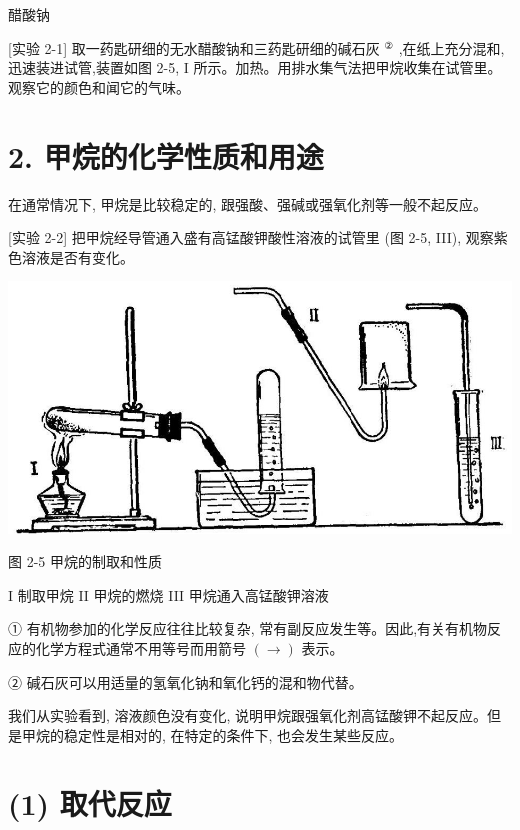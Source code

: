 \documentclass[10pt]{article}
\newcommand{\customfootnote}[1]{
  \let\thefootnote\relax\footnotetext{#1}
}
\begin{document}
\customfootnote{

① \(\sigma\) 音 \(\operatorname{sigm}{\bar{a}}_{0}\)

}

醋酸钠

[实验 2-1] 取一药匙研细的无水醋酸钠和三药匙研细的碱石灰 \({}^{\text{②}}\) ,在纸上充分混和,迅速装进试管,装置如图 2-5, I 所示。加热。用排水集气法把甲烷收集在试管里。观察它的颜色和闻它的气味。

\section*{2. 甲烷的化学性质和用途}

在通常情况下, 甲烷是比较稳定的, 跟强酸、强碱或强氧化剂等一般不起反应。

[实验 2-2] 把甲烷经导管通入盛有高锰酸钾酸性溶液的试管里 (图 2-5, III), 观察紫色溶液是否有变化。

\begin{center}
\includegraphics[max width=1.0\textwidth]{images/01912d16-be99-77bb-9535-4f3ed8d9946f_55_980735.jpg}
\end{center}

图 2-5 甲烷的制取和性质

I 制取甲烷 II 甲烷的燃烧 III 甲烷通入高锰酸钾溶液

① 有机物参加的化学反应往往比较复杂, 常有副反应发生等。因此,有关有机物反应的化学方程式通常不用等号而用箭号 \(\left( \rightarrow \right)\) 表示。

② 碱石灰可以用适量的氢氧化钠和氧化钙的混和物代替。

我们从实验看到, 溶液颜色没有变化, 说明甲烷跟强氧化剂高锰酸钾不起反应。但是甲烷的稳定性是相对的, 在特定的条件下, 也会发生某些反应。

\section*{(1) 取代反应}
\end{document}
